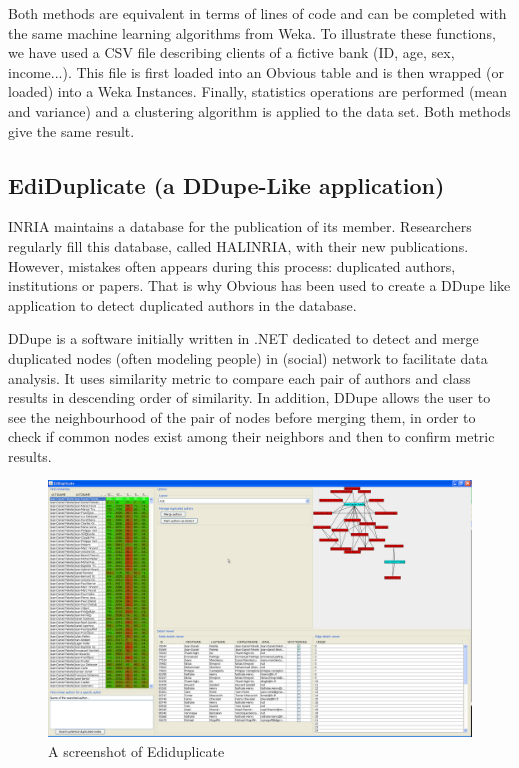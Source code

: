 Both methods are equivalent in terms of lines of code and can be completed with the same machine learning algorithms from Weka. To illustrate these functions, we have used a CSV file describing clients of a fictive bank (ID, age, sex, income...). This file is first loaded into an Obvious table and is then wrapped (or loaded) into a Weka Instances. Finally, statistics operations are performed (mean and variance) and a clustering algorithm is applied to the data set. Both methods give the same result.

\subsection{EdiDuplicate (a DDupe-Like application)}

INRIA maintains a database for the publication of its member. Researchers regularly fill this database, called HALINRIA, with their new publications. However, mistakes often appears during this process: duplicated authors, institutions or papers. That is why Obvious has been used
to create a DDupe like application to detect duplicated authors in the database.

DDupe is a software initially written in .NET dedicated to detect and merge duplicated nodes (often modeling people)  in (social) network to facilitate data analysis. It uses similarity metric to compare each pair  of authors and class results in descending order of similarity. In addition, DDupe allows the user to see the neighbourhood of the pair of nodes before merging them, in order to check if common nodes exist among their neighbors and then to confirm metric results.

\begin{figure}[!h]
\includegraphics[width=\columnwidth]{figures/ediduplicate}
\caption{A screenshot of Ediduplicate}
\label{fig:ediduplicate}
\end{figure}

